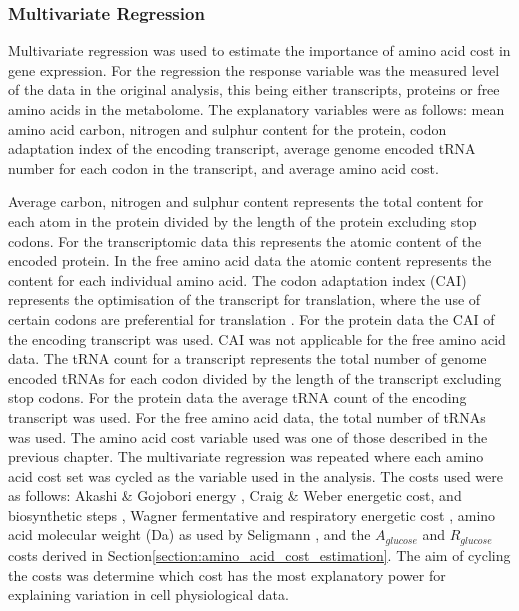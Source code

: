 \subsubsection{Multivariate Regression}

Multivariate regression was used to estimate the importance of amino acid cost in gene expression. For the regression the response variable was the measured level of the data in the original analysis, this being either transcripts, proteins or free amino acids in the metabolome. The explanatory variables were as follows: mean amino acid carbon, nitrogen and sulphur content for the protein, codon adaptation index of the encoding transcript, average genome encoded tRNA number for each codon in the transcript, and average amino acid cost.

Average carbon, nitrogen and sulphur content represents the total content for each atom in the protein divided by the length of the protein excluding stop codons. For the transcriptomic data this represents the atomic content of the encoded protein. In the free amino acid data the atomic content represents the content for each individual amino acid. The codon adaptation index (CAI) represents the optimisation of the transcript for translation, where the use of certain codons are preferential for translation \cite{ikemura1982}. For the protein data the CAI of the encoding transcript was used. CAI was not applicable for the free amino acid data. The tRNA count for a transcript represents the total number of genome encoded tRNAs for each codon divided by the length of the transcript excluding stop codons. For the protein data the average tRNA count of the encoding transcript was used. For the free amino acid data, the total number of tRNAs was used. The amino acid cost variable used was one of those described in the previous chapter. The multivariate regression was repeated where each amino acid cost set was cycled as the variable used in the analysis. The costs used were as follows: Akashi \& Gojobori energy \cite{akashi2002}, Craig \& Weber energetic cost, and biosynthetic steps \cite{craig1998}, Wagner fermentative and respiratory energetic cost \cite{wagner2005}, amino acid molecular weight (Da) as used by Seligmann \cite{seligmann2003}, and the $A_{glucose}$ and $R_{glucose}$ costs derived in Section\vref{section:amino_acid_cost_estimation}. The aim of cycling the costs was determine which cost has the most explanatory power for explaining variation in cell physiological data.

